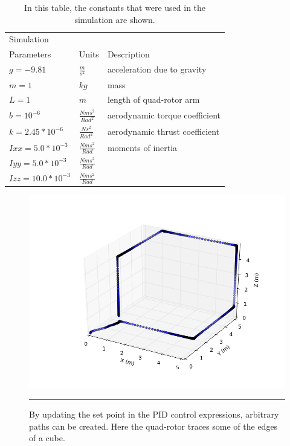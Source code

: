 \begin{table}
\label{table:params}
\begin{doublespace}
\centering
\begin{tabular}{l l l}
    Simulation\\ Parameters & Units & Description\\
    \hline
    $g = -9.81            $& $ \frac{m}{s^2}          $ & acceleration due to gravity\\
    $m = 1                $& $ kg                      $ & mass\\
    $L = 1                $& $ m                       $ & length of quad-rotor arm\\
    $b = 10^{-6}          $& $ \frac{N m s^2}{Rad^2}  $ & aerodynamic torque coefficient\\
    $k = 2.45*10^{-6}     $& $ \frac{N s^2}{Rad^2}    $ & aerodynamic thrust coefficient\\
    $Ixx = 5.0*10^{-3}    $& $ \frac{N m s^2}{Rad}    $ & moments of inertia \\
    $Iyy = 5.0*10^{-3}    $& $ \frac{N m s^2}{Rad}    $ & \\
    $Izz = 10.0*10^{-3}   $& $ \frac{N m s^2}{Rad}    $ & \\
    \hline
\end{tabular}
\caption[Simulation Parameters]{In this table, the constants that were used in the simulation are shown.}
\end{doublespace}
\end{table}

\begin{figure}[htbp]
	\centering
		\includegraphics[scale = 0.5]{Figures/CubeEdges3D.png}
		\rule{35em}{0.5pt}
	\caption[Cube Edges 3D]{By updating the set point in the PID control expressions, arbitrary paths can be created. Here the quad-rotor traces some of the edges of a cube.}
	\label{fig:Cube Edges 3D}
\end{figure}

